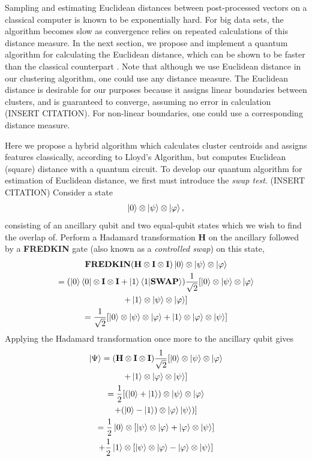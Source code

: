 \documentclass[twocolumn, english]{revtex4-2}
\begin{document}
Sampling and estimating Euclidean distances between post-processed vectors on a classical computer is known to be exponentially hard. For big data sets, the algorithm becomes slow as convergence relies on repeated calculations of this distance measure. In the next section, we propose and implement a quantum algorithm for calculating the Euclidean distance, which can be shown to be faster than the classical counterpart \cite{lloydlearning}. Note that although we use Euclidean distance in our clustering algorithm, one could use any distance measure. The Euclidean distance is desirable for our purposes because it assigns linear boundaries between clusters, and is guaranteed to converge, assuming no error in calculation (INSERT CITATION). For non-linear boundaries, one could use a corresponding distance measure. 

Here we propose a hybrid algorithm which calculates cluster centroids and assigns features classically, according to Lloyd's Algorithm, but computes Euclidean (square) distance with a quantum circuit. To develop our quantum algorithm for estimation of Euclidean distance, we first must introduce the \textit{swap test}. (INSERT CITATION) Consider a state \begin{equation}\ket{0}\otimes\ket{\psi}\otimes\ket{\varphi},\end{equation} consisting of an ancillary qubit and two equal-qubit states which we wish to find the overlap of. Perform a Hadamard transformation \textbf{H} on the ancillary followed by a \textbf{FREDKIN} gate (also known as a \textit{controlled swap}) on this state, \begin{equation}\begin{gathered}
\textbf{FREDKIN}(\textbf{H}\otimes\textbf{I}\otimes\textbf{I})\ket{0}\otimes\ket{\psi}\otimes\ket{\varphi}\\
=(\ket{0}\bra{0}\otimes\textbf{I}\otimes\textbf{I}+\ket{1}\braket{1|\textbf{SWAP}})\frac{1}{\sqrt{2}}[\ket{0}\otimes\ket{\psi}\otimes\ket{\varphi}\\+\ket{1}\otimes\ket{\psi}\otimes\ket{\varphi}]\\
=\frac{1}{\sqrt{2}}[\ket{0}\otimes\ket{\psi}\otimes\ket{\varphi}+\ket{1}\otimes\ket{\varphi}\otimes\ket{\psi}]\end{gathered}\end{equation}
Applying the Hadamard transformation once more to the ancillary qubit gives
\begin{equation}\begin{gathered}
\ket{\Psi}=(\textbf{H}\otimes\textbf{I}\otimes\textbf{I})\frac{1}{\sqrt{2}}[\ket{0}\otimes\ket{\psi}\otimes\ket{\varphi}\\+\ket{1}\otimes\ket{\varphi}\otimes\ket{\psi}]\\
=\frac{1}{2}[(\ket{0}+\ket{1})\otimes\ket{\psi}\otimes\ket{\varphi}\\+(\ket{0}-\ket{1})\otimes\ket{\varphi}\ket{\psi})]\\
=\frac{1}{2}\ket{0}\otimes[\ket{\psi}\otimes\ket{\varphi}+\ket{\varphi}\otimes\ket{\psi}]\\+\frac{1}{2}\ket{1}\otimes[\ket{\psi}\otimes\ket{\varphi}-\ket{\varphi}\otimes\ket{\psi}]
\end{gathered}\end{equation}
\end{document}
